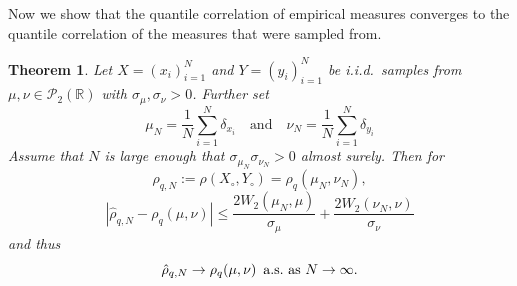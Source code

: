 \documentclass{amsart}
\numberwithin{equation}{section}
\theoremstyle{plain}
\newtheorem{theorem}[subsection]{Theorem}
\theoremstyle{definition}
\newcommand{\abs}[1]{\left\vert#1\right\vert}
\newcommand{\rar}{\rightarrow}
\begin{document}
Now we show that the quantile correlation of empirical measures converges to the quantile correlation of the measures that were sampled from.
\begin{theorem}\label{thm:samplestat}
   Let $X=(x_i)_{i=1}^N$ and $Y=(y_i)_{i=1}^N$  be i.i.d.\ samples from $\mu, \nu \in \mathcal{P}_2(\mathbb{R})$ with $\sigma_\mu,\sigma_\nu>0$.
   Further set
\[
\mu_N = \frac{1}{N} \sum_{i=1}^N \delta_{x_i} \quad \textrm{and} \quad \nu_N = \frac{1}{N} \sum_{i=1}^N \delta_{y_i}
\]
Assume that $N$ is large enough that $\sigma_{\mu_N}\sigma_{\nu_N} >0$ almost surely.
   Then for
   \[
   \hat{\rho}_{q,N} := \rho(X_{\circ}, Y_{\circ}) = \rho_q (\mu_N, \nu_N), 
   \]
   \[
   \abs{\hat{\rho}_{q,N}-\rho_q(\mu,\nu)} \leq \frac{2 W_2(\mu_N,\mu)}{\sigma_\mu} + \frac{2 W_2(\nu_N,\nu)}{\sigma_\nu}
   \]
   and thus
   \[
   \hat{\rho}_{q,N} \rar \rho_q(\mu,\nu) \enskip \textrm{a.s.\ as $N \rar \infty$}.
   \]
\end{theorem}
\end{document}
